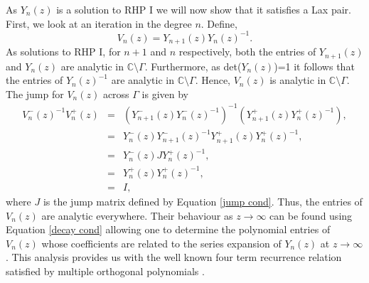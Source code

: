 \documentclass[a4paper,reqno]{amsart}
\numberwithin{equation}{section}
\numberwithin{figure}{section}
\begin{document}
As $Y_n(z)$ is a solution to RHP I we will now show that it satisfies a Lax pair. First, we look at an iteration in the degree $n$. Define,
\begin{equation}
    V_n(z) = Y_{n+1}(z)Y_n(z)^{-1}.
\end{equation}
As solutions to RHP I, for $n+1$ and $n$ respectively, both the entries of $ Y_{n+1}(z)$ and $Y_n(z)$ are analytic in $\mathbb{C}\setminus \Gamma$. Furthermore, as det($Y_n(z)$)=1 it follows that the entries of $Y_n(z)^{-1}$ are analytic in $\mathbb{C}\setminus \Gamma$. Hence, $V_n(z)$ is analytic in $\mathbb{C}\setminus \Gamma$. The jump for $V_n(z)$ across $\Gamma$ is given by 
\begin{eqnarray*}
    V_n^-(z)^{-1}V_n^{+}(z) &=& (Y_{n+1}^-(z)Y_n^-(z)^{-1})^{-1}(Y_{n+1}^+(z)Y_n^+(z)^{-1}),\\
    &=& Y_n^-(z)Y_{n+1}^-(z)^{-1}Y_{n+1}^+(z)Y_n^+(z)^{-1},\\
    &=& Y_n^-(z)J Y_n^+(z)^{-1},\\
    &=& Y_n^+(z) Y_n^+(z)^{-1},\\
    &=& I,
\end{eqnarray*}
where $J$ is the jump matrix defined by Equation \eqref{jump cond}. Thus, the entries of $V_n(z)$ are analytic everywhere. Their behaviour as $z\to\infty$ can be found using Equation \eqref{decay cond} allowing one to determine the polynomial entries of $V_n(z)$ whose coefficients are related to the series expansion of $Y_n(z)$ at $z\to\infty$. This analysis provides us with the well known four term recurrence relation satisfied by multiple orthogonal polynomials \cite{MultRec}.\\
\end{document}
